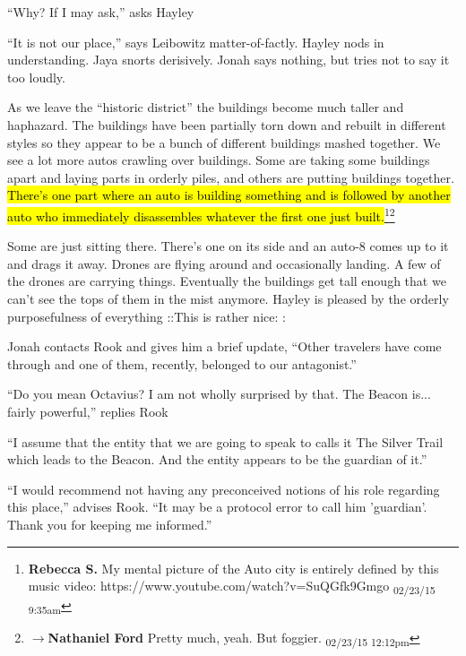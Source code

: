 ``Why?  If I may ask,'' asks Hayley

``It is not our place,'' says Leibowitz matter-of-factly.  Hayley nods in understanding.  Jaya snorts derisively.  Jonah says nothing, but tries not to say it too loudly.





As we leave the ``historic district'' the buildings become much taller and haphazard.  The buildings have been partially torn down and rebuilt in different styles so they appear to be a bunch of different buildings mashed together.  We see a lot more autos crawling over buildings.  Some are taking some buildings apart and laying parts in orderly piles, and others are putting buildings together. \hl{There's one part where an auto is building something and is followed by another auto who immediately disassembles whatever the first one just built.}\footnote{\textbf{Rebecca S. }My mental picture of the Auto city is entirely defined by this music video: https://www.youtube.com/watch?v=SuQGfk9Gmgo \textsubscript{02/23/15 9:35am}}\footnote{$\rightarrow$\textbf{Nathaniel Ford }Pretty much, yeah. But foggier. \textsubscript{02/23/15 12:12pm}}  



Some are just sitting there.  There's one on its side and an auto-8 comes up to it and drags it away.  Drones are flying around and occasionally landing.  A few of the drones are carrying things.  Eventually the buildings get tall enough that we can't see the tops of them in the mist anymore.  Hayley is pleased by the orderly purposefulness of everything {\color[RGB]{74,134,232} ::This is rather nice:} :



Jonah contacts Rook and gives him a brief update, ``Other travelers have come through and one of them, recently, belonged to our antagonist.''

``Do you mean Octavius?  I am not wholly surprised by that.  The Beacon is... fairly powerful,'' replies Rook

``I assume that the entity that we are going to speak to calls it The Silver Trail which leads to the Beacon.  And the entity appears to be the guardian of it.''

``I would recommend not having any preconceived notions of his role regarding this place,'' advises Rook.  ``It may be a protocol error to call him 'guardian'.  Thank you for keeping me informed.''



